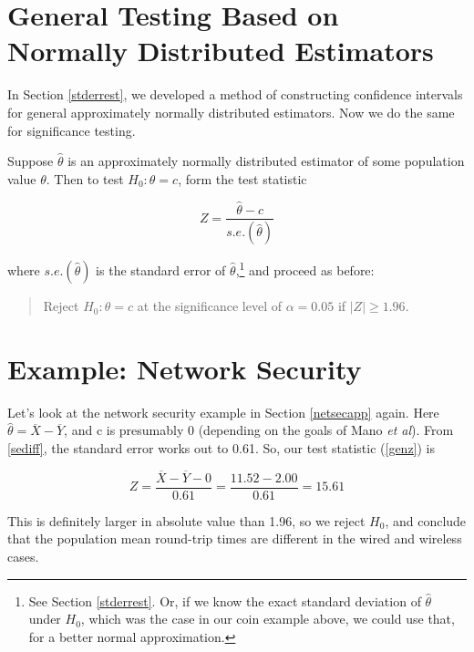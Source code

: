 \section{General Testing Based on Normally Distributed Estimators}
\label{genhyp}

In Section \ref{stderrest}, we developed a method of constructing
confidence intervals for general approximately normally distributed
estimators.  Now we do the same for significance testing.

Suppose $\widehat{\theta}$ is an approximately normally distributed
estimator of some population value $\theta$.  Then to test $H_0: \theta
= c$, form the test statistic

\begin{equation}
\label{genz}
Z = \frac{\widehat{\theta} - c}{s.e.(\widehat{\theta})}
\end{equation}

where $s.e.(\widehat{\theta})$ is the standard error of
$\widehat{\theta}$,\footnote{See Section \ref{stderrest}.  Or, if we
know the exact standard deviation of $\widehat{\theta}$ under $H_0$,
which was the case in our coin example above, we could use that, for a
better normal approximation.} and proceed as before:  

\begin{quote}

Reject $H_0:  \theta = c$ at the significance level of  $\alpha=0.05$ if
$|Z| \geq 1.96$.

\end{quote}

\section{Example: Network Security}

Let's look at the network security example in Section \ref{netsecapp}
again.  Here $\widehat{\theta} = \overline{X} - \overline{Y}$, and c is
presumably 0 (depending on the goals of Mano {\it et al}).  From
\ref{sediff}, the standard error works out to 0.61.  So, our test
statistic (\ref{genz}) is

\begin{equation}
Z = \frac{\overline{X} - \overline{Y} - 0}{0.61} = \frac{11.52-2.00}{0.61} = 15.61
\end{equation}

This is definitely larger in absolute value than 1.96, so we reject
$H_0$, and conclude that the population mean round-trip times are
different in the wired and wireless cases.

